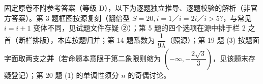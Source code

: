 
\begin{gktip}
固定原卷不附参考答案（等级 D），以下为逐题独立推导、逐题校验的解析（非官方答案）。第 3 题框图按源复刻（翻倍型 \(S=20,i=1\)／\(i=2i\)／\(i>5?\)，与常见 \(i=i+1\) 变体不同，见试题文件存疑 ②）；第 5 题的四个选项在源中排于栏 2 之首（断栏排版），本库按题归并；第 14 题系数为 \(\dfrac{1}{9\lambda}\)（照源）；第 19 题 (3) 按题面字面取两支之\textbf{并}（若命题本意限于第二象限则缩为 \(\left(-\infty,-\dfrac{2\sqrt{3}}{3}\right)\)，见该题末存疑登记）；第 20 题 (1) 的单调性须分 \(n\) 的奇偶讨论。
\end{gktip}

